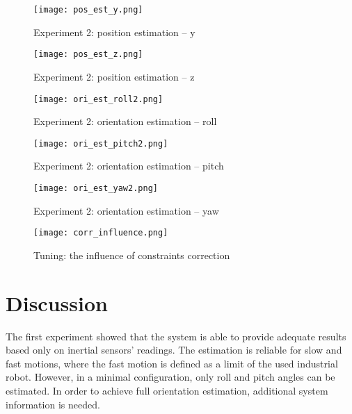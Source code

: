 \begin{figure}[p]
	\centering
	\texttt{[image: pos\_est\_y.png]}
	\caption{Experiment 2: position estimation -- y}
	\label{pos_est_y}
\end{figure}

\begin{figure}[p]
	\centering
	\texttt{[image: pos\_est\_z.png]}
	\caption{Experiment 2: position estimation -- z}
	\label{pos_est_z}
\end{figure}

\begin{figure}[p]
	\centering
	\texttt{[image: ori\_est\_roll2.png]}
	\caption{Experiment 2: orientation estimation -- roll}
	\label{ori_est_roll2}
\end{figure}

\begin{figure}[p]
	\centering
	\texttt{[image: ori\_est\_pitch2.png]}
	\caption{Experiment 2: orientation estimation -- pitch}
	\label{ori_est_pitch2}
\end{figure}


\begin{figure}[p]
	\centering
	\texttt{[image: ori\_est\_yaw2.png]}
	\caption{Experiment 2: orientation estimation -- yaw}
	\label{ori_est_yaw2}
\end{figure}


\begin{figure}[p]
	\centering
	\texttt{[image: corr\_influence.png]}
	\caption{Tuning: the influence of constraints correction}
	\label{corr_strength}
\end{figure}

\section{Discussion}

The first experiment showed that the system is able to provide adequate results based only on inertial sensors' readings. The estimation is reliable for slow and fast motions, where the fast motion is defined as a limit of the used industrial robot. However, in a minimal configuration, only roll and pitch angles can be estimated. In order to achieve full orientation estimation, additional system information is needed.\\

